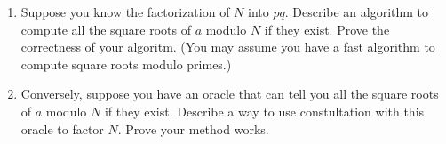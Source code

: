 \documentclass[11pt]{article}
\begin{document}
\begin{enumerate}
{\begin{enumerate}
{    }
    \item{
    Suppose you know the factorization of $N$ into $pq$.  Describe an algorithm to compute all the square roots of $a$ modulo $N$ if they exist.  Prove the correctness of your algoritm.  (You may assume you have a fast algorithm to compute square roots modulo primes.)
    }
    \item{
    Conversely, suppose you have an oracle that can tell you all the square roots of $a$ modulo $N$ if they exist.  Describe a way to use constultation with this oracle to factor $N$.  Prove your method works.
    }
  \end{enumerate}
}
\end{enumerate}
\end{document}
